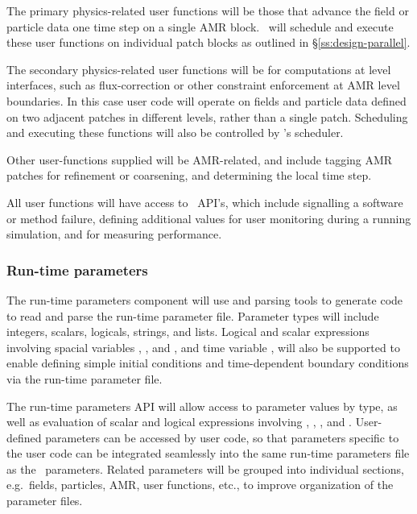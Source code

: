 \documentclass[10pt,twocolumn]{article}
\begin{document}
The primary physics-related user functions will be those that advance
the field or particle data one time step on a single AMR block.
\cello\ will schedule and execute these user functions on individual
patch blocks as outlined in \S\ref{ss:design-parallel}.

The secondary physics-related user functions will be for computations
at level interfaces, such as flux-correction or other constraint
enforcement at AMR level boundaries.  In this case user code will
operate on fields and particle data defined on two adjacent patches in
different levels, rather than a single patch.  Scheduling and
executing these functions will also be controlled by \cello's scheduler.

Other user-functions supplied will be AMR-related, and include tagging
AMR patches for refinement or coarsening, and determining the local
time step.

All user functions will have access to \cello\ API's, which include
signalling a software or method failure, defining additional
values for user monitoring during a running simulation, and for
measuring performance.

\subsubsection{Run-time parameters} \label{sss:design-parameters}

The run-time parameters component will use  and
 parsing tools to generate code to read and parse the
run-time parameter file.  Parameter types will include integers,
scalars, logicals, strings, and lists.  Logical and scalar expressions
involving spacial variables , , and , and time
variable , will also be supported to enable defining simple
initial conditions and time-dependent boundary conditions via the
run-time parameter file.

The run-time parameters API will allow access to parameter values by
type, as well as evaluation of scalar and logical expressions
involving , , , and .  User-defined
parameters can be accessed by user code, so that parameters specific
to the user code can be integrated seamlessly into the same run-time
parameters file as the \cello\ parameters.  Related parameters will be
grouped into individual sections, e.g.~fields, particles, AMR, user
functions, etc., to improve organization of the parameter files.
\end{document}
